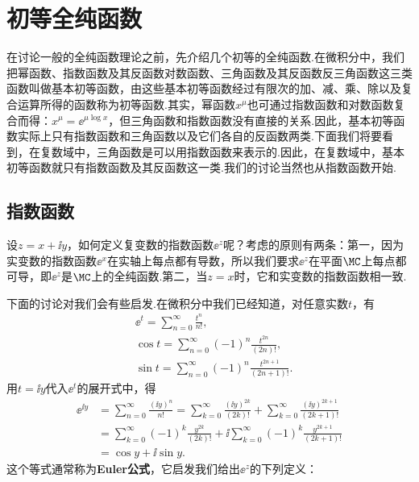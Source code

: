 \section{初等全纯函数\label{sec2.4}}
在讨论一般的全纯函数理论之前，先介绍几个初等的全纯函数.在微积分中，我们把幂函数、指数函数及其反函数对数函数、三角函数及其反函数反三角函数这三类函数叫做基本初等函数，由这些基本初等函数经过有限次的加、减、乘、除以及复合运算所得的函数称为初等函数.其实，幂函数$x^\mu$也可通过指数函数和对数函数复合而得：$x^\mu=\ee^{\mu\log x}$，但三角函数和指数函数没有直接的关系.因此，基本初等函数实际上只有指数函数和三角函数以及它们各自的反函数两类.下面我们将要看到，在复数域中，三角函数是可以用指数函数来表示的.因此，在复数域中，基本初等函数就只有指数函数及其反函数这一类.我们的讨论当然也从指数函数开始.

\subsection{指数函数}
设$z=x+\ii y$，如何定义复变数的指数函数$\ee^{z}$呢？考虑的原则有两条：第一，因为实变数的指数函数$\ee^x$在实轴上每点都有导数，所以我们要求$\ee^z$在平面$\MC$上每点都可导，即$\ee^z$是$\MC$上的全纯函数.第二，当$z=x$时，它和实变数的指数函数相一致.

下面的讨论对我们会有些启发.在微积分中我们已经知道，对任意实数$t$，有
\begin{align*}
&\ee^t=\sum_{n=0}^\infty \frac{t^n}{n!},\\
&\cos t=\sum_{n=0}^\infty(-1)^n\frac{t^{2n}}{(2n)!},\\
&\sin t=\sum_{n=0}^\infty(-1)^n\frac{t^{2n+1}}{(2n+1)!}.
\end{align*}
用$t=\ii y$代入$\ee^t$的展开式中，得
\begin{align*}
\ee^{\ii y}&=\sum_{n=0}^\infty\frac{(\ii y)^n}{n!}=\sum_{k=0}^\infty\frac{(\ii y)^{2k}}{(2k)!}+\sum_{k=0}^\infty\frac{(\ii y)^{2k+1}}{(2k+1)!}\\
&=\sum_{k=0}^\infty(-1)^k\frac{y^{2k}}{(2k)!}+
\ii\sum_{k=0}^\infty(-1)^k\frac{y^{2k+1}}{(2k+1)!}\\
&=\cos y+\ii\sin y.
\end{align*}
这个等式通常称为\textbf{Euler公式}，它启发我们给出$\ee^z$的下列定义：

